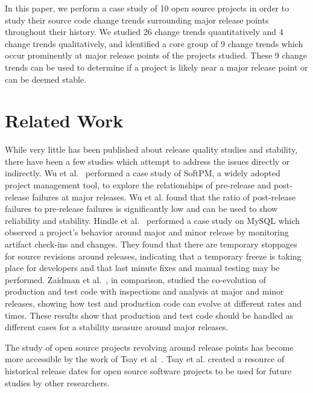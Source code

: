 \documentclass{sig-alternate}
\begin{document}
In this paper, we perform a case study of 10 open source projects in order to study their source code change trends surrounding major release points
throughout their history. We studied 26 change trends quantitatively and 4 change trends qualitatively, and identified a core group of 9 change trends which occur
prominently at major release points of the projects studied. These 9 change trends can be used to determine if a project is likely near a major release point
or can be deemed stable.

\section{Related Work}
\label{sec:rel}
While very little has been published about release quality studies and stability, there have been a few studies which attempt to address the issues directly
or indirectly. Wu et al.~\cite{Wu:2008:QAF} performed a case study of SoftPM, a widely adopted project management tool, to explore the relationships of
pre-release and post-release failures at major releases. Wu et al. found that the ratio of post-release failures to pre-release failures is significantly low
and can be used to show reliability and stability. Hindle et al.~\cite{Hindle:2007:RPD} performed a case study on MySQL which observed a project's behavior
around major and minor release by monitoring artifact check-ins and changes. They found that there are temporary stoppages for source revisions around releases,
indicating that a temporary freeze is taking place for developers and that last minute fixes and manual testing may be performed.
Zaidman et al.~\cite{Zaidman:2011:SCP}, in comparison, studied the co-evolution of production and test code with inspections and analysis
at major and minor releases, showing how test and production code can evolve at different rates and times. These results show that production
and test code should be handled as different cases for a stability measure around major releases. 

The study of open source projects revolving around release points has become more accessible by the work of Tsay et al~\cite{Tsay:2011:EMO}. Tsay et al. created
a resource of historical release dates for open source software projects to be used for future studies by other researchers.
\end{document}

